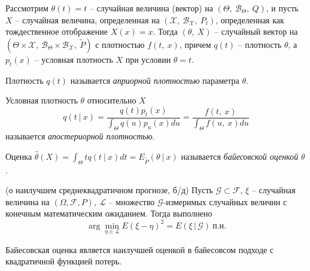 Рассмотрим $\displaystyle \theta ( t) =t$ -- случайная величина (вектор) на $\displaystyle ( \Theta ,\ \mathcal{B}_{\Theta } ,\ Q)$, и пусть $\displaystyle X$ -- случайная величина, определенная на $\displaystyle (\mathcal{X} ,\ \mathcal{B}_{\mathcal{X}} ,\ P_{t})$, определенная как тождественное отображение $\displaystyle X( x) =x$. Тогда $\displaystyle ( \theta ,\ X)$ -- случайный вектор на $\displaystyle \left( \Theta \times \mathcal{X} ,\ \mathcal{B}_{\Theta } \times \mathcal{B}_{\mathcal{X}} ,\ \tilde{P}\right)$ с плотностью $\displaystyle f( t,\ x)$, причем $\displaystyle q( t)$ -- плотность $\displaystyle \theta $, а $\displaystyle p_{t}( x)$ -- условная плотность $\displaystyle X$ при условии $\displaystyle \theta =t$.
\begin{definition}
    Плотность $\displaystyle q( t)$ называется \textit{априорной плотностью} параметра $\displaystyle \theta $.
\end{definition}
\begin{definition}
    Условная плотность $\displaystyle \theta $ относительно $\displaystyle X$
    \begin{equation*}
        q( t\ |\ x) =\dfrac{q( t) p_{t}( x)}{\int _{\Theta } q( u) p_{u}( x) du} =\dfrac{f( t,\ x)}{\int _{\Theta } f( u,\ x) du}
    \end{equation*}
    называется \textit{апостериорной плотностью}.
\end{definition}
\begin{definition}
    Оценка $\displaystyle \hat{\theta }( X) =\int _{\Theta } tq( t\ |\ x) dt=E_{\tilde{P}}( \theta \ |\ x)$ называется \textit{байесовской оценкой} $\displaystyle \theta $.
\end{definition}
\begin{theorem}
    (о наилучшем среднеквадратичном прогнозе, б/д) Пусть $\mathcal{G} \subset \mathcal{F}$, $\xi$ -- случайная величина на $(\Omega, \mathcal{F}, P),\ \mathcal{L}$ -- множество $\mathcal{G}$-измеримых случайных величин с конечным математическим ожиданием. Тогда выполнено
    \begin{equation*}
        \arg\min_{\eta\in\mathcal{L}}E(\xi - \eta)^2 = E(\xi\, \vert\, \mathcal{G})\ \text{п.н.}
    \end{equation*}
\end{theorem}
\begin{theorem}
    Байесовская оценка является наилучшей оценкой в байесовсом подходе с квадратичной функцией потерь.
\end{theorem}
